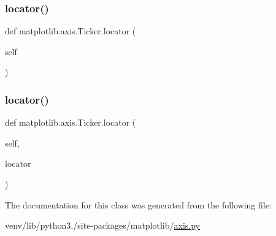 \mbox{\label{classmatplotlib_1_1axis_1_1Ticker_a1914202bdb293e5816128241834736e0}} 
\subsubsection{\texorpdfstring{locator()}{locator()}\hspace{0.1cm}{\footnotesize\ttfamily [1/2]}}
{\footnotesize\ttfamily def matplotlib.\+axis.\+Ticker.\+locator (\begin{DoxyParamCaption}\item[{}]{self }\end{DoxyParamCaption})}

\mbox{\label{classmatplotlib_1_1axis_1_1Ticker_a26dabd3c190a96ca2e50c41929cf2b1d}} 
\subsubsection{\texorpdfstring{locator()}{locator()}\hspace{0.1cm}{\footnotesize\ttfamily [2/2]}}
{\footnotesize\ttfamily def matplotlib.\+axis.\+Ticker.\+locator (\begin{DoxyParamCaption}\item[{}]{self,  }\item[{}]{locator }\end{DoxyParamCaption})}



The documentation for this class was generated from the following file\+:\begin{DoxyCompactItemize}
\item 
venv/lib/python3./site-\/packages/matplotlib/\hyperlink{axis_8py}{axis.\+py}\end{DoxyCompactItemize}
